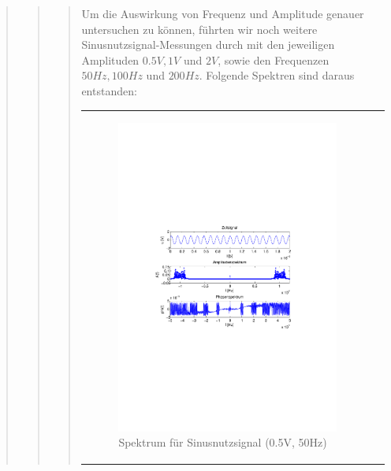 \begin{quote}
\begin{quote}
\begin{quote}
        Um die Auswirkung von Frequenz und Amplitude genauer untersuchen zu
        können, führten wir noch weitere Sinusnutzsignal-Messungen durch mit den
        jeweiligen Amplituden $0.5V, 1V$ und $2V$, sowie den Frequenzen $50Hz,
        100Hz$ und $200Hz$. Folgende Spektren sind daraus entstanden:
        
               \begin{center}
            \begin{tabular}{ll}

            \hspace{-14em}
                \begin{minipage}{0.6\textwidth}

                    \begin{figure}[H]
                        \label{fig:}
                        \includegraphics[scale=0.5, trim = 2cm 6.5cm 1.5cm
                        8.5cm, clip]{./Bilder/sin_a05_f50}
                        \caption{Spektrum für Sinusnutzsignal (0.5V, 50Hz)}
                    \end{figure}


\end{minipage}
\end{tabular}
\end{center}
\end{quote}
\end{quote}
\end{quote}
